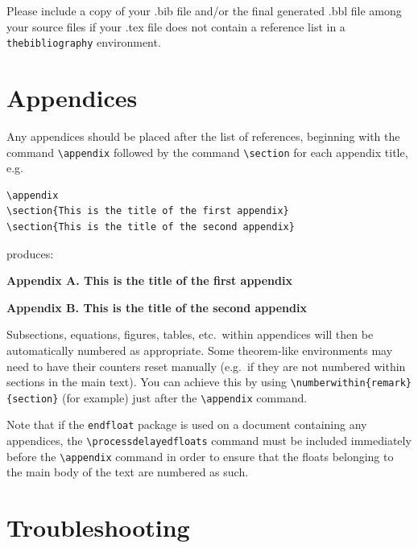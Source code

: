 \documentclass[]{interact}
\theoremstyle{plain}%
\theoremstyle{definition}
\theoremstyle{remark}
\begin{document}
Please include a copy of your .bib file and/or the final generated .bbl file among your source files if your .tex file does not contain a reference list in a \texttt{thebibliography} environment.


\section{Appendices}

Any appendices should be placed after the list of references, beginning with the command \verb"\appendix" followed by the command \verb"\section" for each appendix title, e.g.
\begin{verbatim}
\appendix
\section{This is the title of the first appendix}
\section{This is the title of the second appendix}
\end{verbatim}
produces:\medskip

\noindent\textbf{Appendix A. This is the title of the first appendix}\medskip

\noindent\textbf{Appendix B. This is the title of the second appendix}\medskip

\noindent Subsections, equations, figures, tables, etc.\ within appendices will then be automatically numbered as appropriate. Some theorem-like environments may need to have their counters reset manually (e.g.\ if they are not numbered within sections in the main text). You can achieve this by using \verb"\numberwithin{remark}{section}" (for example) just after the \verb"\appendix" command.

Note that if the \verb"endfloat" package is used on a document containing any appendices, the \verb"\processdelayedfloats" command must be included immediately before the \verb"\appendix" command in order to ensure that the floats belonging to the main body of the text are numbered as such.


\appendix

\section{Troubleshooting}
\end{document}
